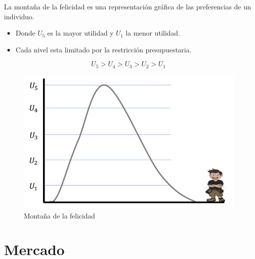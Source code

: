\documentclass{templateNote}
\begin{document}
La montaña de la felicidad es una representación gráfica de las preferencias de un individuo.\\
\begin{itemize}
    \item Donde $U_5$ es la mayor utilidad y $U_1$ la menor utilidad.
    \item Cada nivel esta limitado por la restricción presupuestaria.
\end{itemize}

\begin{equation*}
    U_5 > U_4 > U_3 > U_2 > U_1
\end{equation*}

\begin{figure}[H]
    \centering
    \includegraphics[scale=0.5]{img/Mountain.png}
    \caption{Montaña de la felicidad}
\end{figure}

\section{Mercado}
\end{document}
